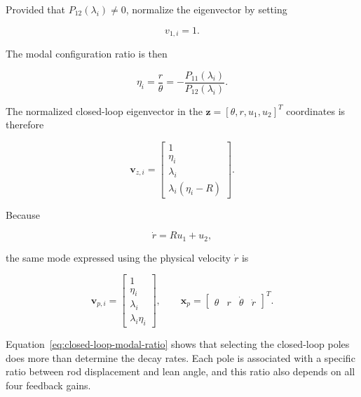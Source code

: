 Provided that $P_{12}(\lambda_i)\neq0$, normalize the eigenvector by setting

\begin{equation}
v_{1,i}=1.
\end{equation}

The modal configuration ratio is then

\begin{equation}
\eta_i
=
\frac{r}{\theta}
=
-\frac{
P_{11}(\lambda_i)
}
{
P_{12}(\lambda_i)
}.
\label{eq:closed-loop-modal-ratio}
\end{equation}

The normalized closed-loop eigenvector in the
$\mathbf{z}=[\theta,r,u_1,u_2]^T$ coordinates is therefore

\begin{equation}
\mathbf{v}_{z,i}
=
\begin{bmatrix}
1 \\[1mm]
\eta_i \\[1mm]
\lambda_i \\[1mm]
\lambda_i(\eta_i-R)
\end{bmatrix}.
\label{eq:normalized-closed-loop-eigenvector}
\end{equation}

Because

\begin{equation}
\dot{r}=Ru_1+u_2,
\end{equation}

the same mode expressed using the physical velocity $\dot{r}$ is

\begin{equation}
\mathbf{v}_{p,i}
=
\begin{bmatrix}
1 \\[1mm]
\eta_i \\[1mm]
\lambda_i \\[1mm]
\lambda_i\eta_i
\end{bmatrix},
\qquad
\mathbf{x}_p
=
\begin{bmatrix}
\theta &
r &
\dot{\theta} &
\dot{r}
\end{bmatrix}^{T}.
\label{eq:physical-closed-loop-eigenvector}
\end{equation}

Equation~\eqref{eq:closed-loop-modal-ratio} shows that selecting the closed-loop poles does more than determine the decay rates. Each pole is associated with a specific ratio between rod displacement and lean angle, and this ratio also depends on all four feedback gains.

